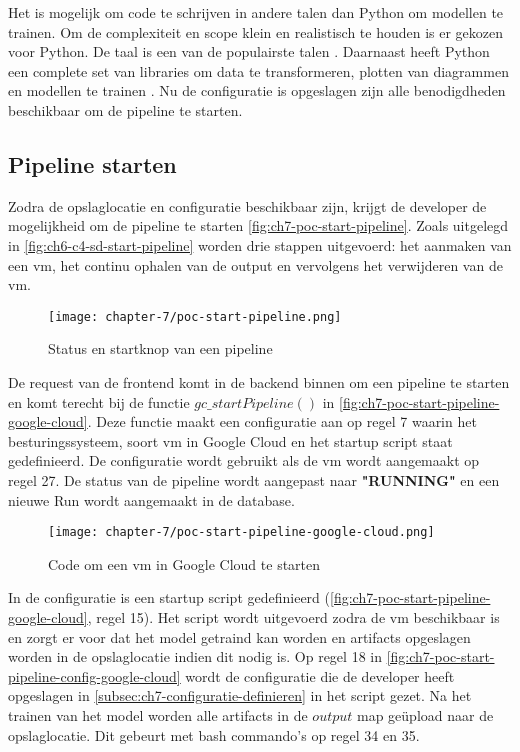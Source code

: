 Het is mogelijk om code te schrijven in andere talen dan Python om modellen te trainen. Om de complexiteit en scope klein en realistisch te houden is er gekozen voor Python. De taal is een van de populairste talen \cite{stack-overflow-survey-2020-loved-dreaded-framework-libraries-tools}. Daarnaast heeft Python een complete set van libraries om data te transformeren, plotten van diagrammen en modellen te trainen \cite{python-libraries}. Nu de configuratie is opgeslagen zijn alle benodigdheden beschikbaar om de pipeline te starten. 

\subsection{Pipeline starten}\label{subsec:ch7-pipeline-starten}
Zodra de opslaglocatie en configuratie beschikbaar zijn, krijgt de developer de mogelijkheid om de pipeline te starten \autoref{fig:ch7-poc-start-pipeline}. Zoals uitgelegd in \autoref{fig:ch6-c4-sd-start-pipeline} worden drie stappen uitgevoerd: het aanmaken van een \acrshort{vm}, het continu ophalen van de output en vervolgens het verwijderen van de \acrshort{vm}.

\begin{figure}[hbt!]
  \centering
  \texttt{[image: chapter-7/poc-start-pipeline.png]}
  \caption{Status en startknop van een pipeline}
  \label{fig:ch7-poc-start-pipeline}
\end{figure}

De request van de frontend komt in de backend binnen om een pipeline te starten en komt terecht bij de functie \(gc\_startPipeline()\) in \autoref{fig:ch7-poc-start-pipeline-google-cloud}. Deze functie maakt een configuratie aan op regel 7 waarin het besturingssysteem, soort \acrshort{vm} in Google Cloud en het startup script staat gedefinieerd. De configuratie wordt gebruikt als de \acrshort{vm} wordt aangemaakt op regel 27. De status van de pipeline wordt aangepast naar \textbf{"RUNNING"} en een nieuwe Run wordt aangemaakt in de database.

\begin{figure}[hbt!]
  \centering
  \texttt{[image: chapter-7/poc-start-pipeline-google-cloud.png]}
  \caption{Code om een \acrfull{vm} in Google Cloud te starten}
  \label{fig:ch7-poc-start-pipeline-google-cloud}
\end{figure}

\newpage

In de configuratie is een startup script gedefinieerd (\autoref{fig:ch7-poc-start-pipeline-google-cloud}, regel 15). Het script wordt uitgevoerd zodra de \acrshort{vm} beschikbaar is en zorgt er voor dat het model getraind kan worden en \glspl{artifact} opgeslagen worden in de opslaglocatie indien dit nodig is. Op regel 18 in \autoref{fig:ch7-poc-start-pipeline-config-google-cloud} wordt de configuratie die de developer heeft opgeslagen in \autoref{subsec:ch7-configuratie-definieren} in het script gezet. Na het trainen van het model worden alle \glspl{artifact} in de \(output\) map geüpload naar de opslaglocatie. Dit gebeurt met bash commando's op regel 34 en 35.

